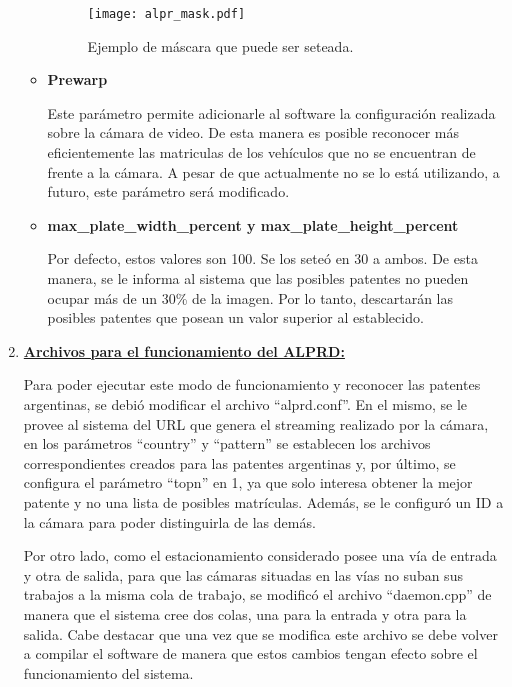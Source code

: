 \begin{enumerate}
\begin{itemize}
		\begin{figure}[H]
			\centering
			\texttt{[image: alpr\_mask.pdf]}
			\caption{Ejemplo de máscara que puede ser seteada.}
			\label{fig:img_mask}
		\end{figure}
		
		\item \textbf{Prewarp} 
		
		Este parámetro permite adicionarle al software la configuración realizada sobre la cámara de video. De esta manera es posible reconocer más eficientemente las matriculas de los vehículos que no se encuentran de frente a la cámara. A pesar de que actualmente no se lo está utilizando, a futuro, este parámetro será modificado.
		
		\item \textbf{max\_plate\_width\_percent y max\_plate\_height\_percent}
		
		Por defecto, estos valores son 100. Se los seteó en 30 a ambos. De esta manera, se le informa al sistema que las posibles patentes no pueden ocupar más de un 30\% de la imagen. Por lo tanto, descartarán las posibles patentes que posean un valor superior al establecido.
		
		
	\end{itemize}
	
	\item \textbf{\underline{Archivos para el funcionamiento del ALPRD:}}
	
	Para poder ejecutar este modo de funcionamiento y reconocer las patentes argentinas, se debió modificar el archivo ``alprd.conf''. En el mismo, se le provee al sistema del URL que genera el streaming realizado por la cámara, en los parámetros ``country'' y ``pattern'' se establecen los archivos correspondientes creados para las patentes argentinas y, por último, se configura el parámetro ``topn'' en 1, ya que solo interesa obtener la mejor patente y no una lista de posibles matrículas. Además, se le configuró un ID a la cámara para poder distinguirla de las demás. 
	
	Por otro lado, como el estacionamiento considerado posee una vía de entrada y otra de salida, para que las cámaras situadas en las vías no suban sus trabajos a la misma cola de trabajo, se modificó el archivo ``daemon.cpp'' de manera que el sistema cree dos colas, una para la entrada y otra para la salida. Cabe destacar que una vez que se modifica este archivo se debe volver a compilar el software de manera que estos cambios tengan efecto sobre el funcionamiento del sistema. 
	

\end{enumerate}

